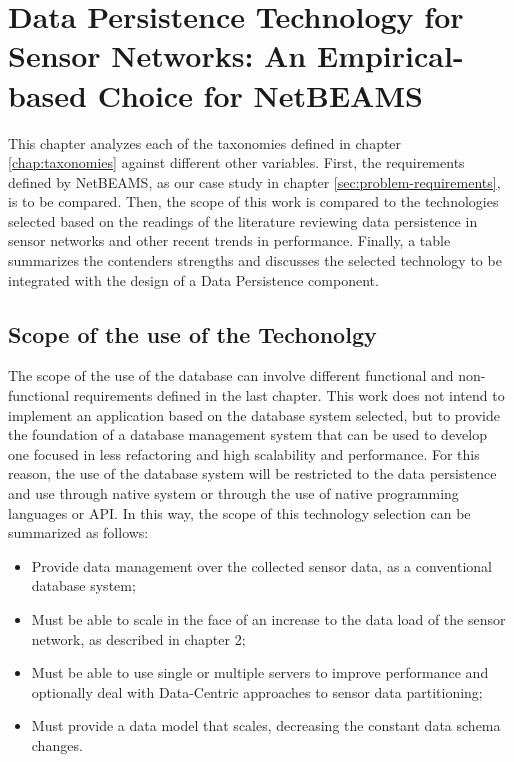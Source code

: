 

\chapter{Data Persistence Technology for Sensor Networks: An Empirical-based
Choice for NetBEAMS}

This chapter analyzes each of the taxonomies defined in chapter
\ref{chap:taxonomies} against different other variables. First, the
requirements defined by NetBEAMS, as our case study in chapter
\ref{sec:problem-requirements}, is to be compared. Then, the scope of this
work is compared to the technologies selected based on the readings of the
literature reviewing data persistence in sensor networks and other recent
trends in performance. Finally, a table summarizes the contenders strengths
and discusses the selected technology to be integrated with the design of a
Data Persistence component.

\section{Scope of the use of the Techonolgy}

The scope of the use of the database can involve different functional and
non-functional requirements defined in the last chapter. This work does not
intend to implement an application based on the database system selected, but
to provide the foundation of a database management system that can be used to
develop one focused in less refactoring and high scalability and performance.
For this reason, the use of the database system will be restricted to the data
persistence and use through native system or through the use of native
programming languages or API. In this way, the scope of this technology
selection can be summarized as follows:

\begin{itemize}
  \item Provide data management over the collected sensor data, as a
  conventional database system;
  \item Must be able to scale in the face of an increase to the data load of
  the sensor network, as described in chapter 2;
  \item  Must be able to use single or multiple servers to improve performance
  and optionally deal with Data-Centric approaches to sensor data partitioning;
  \item Must provide a data model that scales, decreasing the constant data
  schema changes.
\end{itemize}

